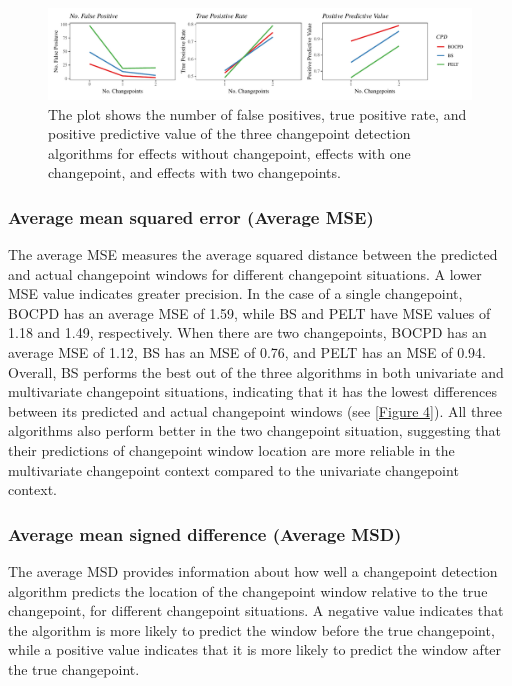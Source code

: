 \documentclass[]{interact}
\theoremstyle{plain}%
\theoremstyle{definition}
\theoremstyle{remark}
\begin{document}
{	\begin{figure}[h]
		\captionsetup{justification=raggedright}
		\renewcommand{\figurename}{Figure}
		\centering
		\includegraphics[width=\textwidth,height=\textheight,keepaspectratio]{FPTPRPPV}
		\caption{\fontsize{8}{10}\selectfont The plot shows the number of false positives, true positive rate, and positive predictive value of the three changepoint detection algorithms for effects without changepoint, effects with one changepoint, and effects with two changepoints.}
		\label{Figure 3}
	\end{figure}

    \subsubsection{Average mean squared error (Average MSE)}
    
    \hspace{0.28cm} The average MSE measures the average squared distance between the predicted and actual changepoint windows for different changepoint situations. A lower MSE value indicates greater precision. In the case of a single changepoint, BOCPD has an average MSE of 1.59, while BS and PELT have MSE values of 1.18 and 1.49, respectively. When there are two changepoints, BOCPD has an average MSE of 1.12, BS has an MSE of 0.76, and PELT has an MSE of 0.94. Overall, BS performs the best out of the three algorithms in both univariate and multivariate changepoint situations, indicating that it has the lowest differences between its predicted and actual changepoint windows (see \autoref{Figure 4}). All three algorithms also perform better in the two changepoint situation, suggesting that their predictions of changepoint window location are more reliable in the multivariate changepoint context compared to the univariate changepoint context.

    \subsubsection{Average mean signed difference (Average MSD)}
    
    \hspace{0.28cm} The average MSD provides information about how well a changepoint detection algorithm predicts the location of the changepoint window relative to the true changepoint, for different changepoint situations. A negative value indicates that the algorithm is more likely to predict the window before the true changepoint, while a positive value indicates that it is more likely to predict the window after the true changepoint. \\
    
}
\end{document}
